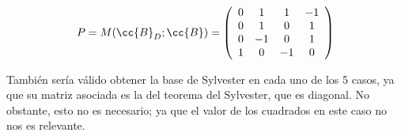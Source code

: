 \begin{ejercicio}
\begin{enumerate}
\begin{itemize}
            \begin{equation*}
                P=M(\cc{B}_D; \cc{B})=\left(\begin{array}{cccc}
                    0 & 1 & 1 & -1 \\
                    0 & 1 & 0 & 1 \\
                    0 & -1 & 0 & 1 \\
                    1 & 0 & -1 & 0
                \end{array} \right)
            \end{equation*}
        \end{itemize}

        \begin{observacion}
            También sería válido obtener la base de Sylvester en cada uno de los 5 casos, ya que su matriz asociada es la del teorema del Sylvester, que es diagonal. No obstante, esto no es necesario; ya que el valor de los cuadrados en este caso no nos es relevante.
        \end{observacion}

        

        
    \end{enumerate}
\end{ejercicio}

